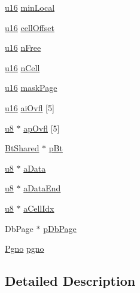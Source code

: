 \begin{DoxyCompactItemize}
\item 
\hyperlink{sqlite3_8c_a20f2299e322dcbde37cb07b16910b843}{u16} \hyperlink{struct_mem_page_acae49d06fe5c209d808832232cee4a00}{min\+Local}
\item 
\hyperlink{sqlite3_8c_a20f2299e322dcbde37cb07b16910b843}{u16} \hyperlink{struct_mem_page_adda6243a1481abb2611fdf378cccb161}{cell\+Offset}
\item 
\hyperlink{sqlite3_8c_a20f2299e322dcbde37cb07b16910b843}{u16} \hyperlink{struct_mem_page_a8b19fe94efd4afc543f05f4e58603bcb}{n\+Free}
\item 
\hyperlink{sqlite3_8c_a20f2299e322dcbde37cb07b16910b843}{u16} \hyperlink{struct_mem_page_af6e66bd78bd9dfd8b79478b8aa086f09}{n\+Cell}
\item 
\hyperlink{sqlite3_8c_a20f2299e322dcbde37cb07b16910b843}{u16} \hyperlink{struct_mem_page_ae5f02929a64d10719bd0186687524afd}{mask\+Page}
\item 
\hyperlink{sqlite3_8c_a20f2299e322dcbde37cb07b16910b843}{u16} \hyperlink{struct_mem_page_a387d18f12379bccb6e2d1b9842a5c3ff}{ai\+Ovfl} \mbox{[}5\mbox{]}
\item 
\hyperlink{sqlite3_8c_a74a0f6424ae628af25f23f0a35f6ead3}{u8} $\ast$ \hyperlink{struct_mem_page_a1a39c11853c230782c10dc115064a62a}{ap\+Ovfl} \mbox{[}5\mbox{]}
\item 
\hyperlink{struct_bt_shared}{Bt\+Shared} $\ast$ \hyperlink{struct_mem_page_a2bc66d19c064bb25ff335241f8c621df}{p\+Bt}
\item 
\hyperlink{sqlite3_8c_a74a0f6424ae628af25f23f0a35f6ead3}{u8} $\ast$ \hyperlink{struct_mem_page_a13132202291db0dcb602d32de00dd312}{a\+Data}
\item 
\hyperlink{sqlite3_8c_a74a0f6424ae628af25f23f0a35f6ead3}{u8} $\ast$ \hyperlink{struct_mem_page_a1967815674f08d2a4d3555c654aeafb4}{a\+Data\+End}
\item 
\hyperlink{sqlite3_8c_a74a0f6424ae628af25f23f0a35f6ead3}{u8} $\ast$ \hyperlink{struct_mem_page_a8f99cccf1b4bf600f3d429e9ea967dc9}{a\+Cell\+Idx}
\item 
Db\+Page $\ast$ \hyperlink{struct_mem_page_aa1db4f5467c8257caf8afe796f799c98}{p\+Db\+Page}
\item 
\hyperlink{sqlite3_8c_aec0c653e8dd16e4639caf2f8ea54f55c}{Pgno} \hyperlink{struct_mem_page_a77cf3333a46c0b2e6d1614dce1a6405a}{pgno}
\end{DoxyCompactItemize}


\subsection{Detailed Description}


